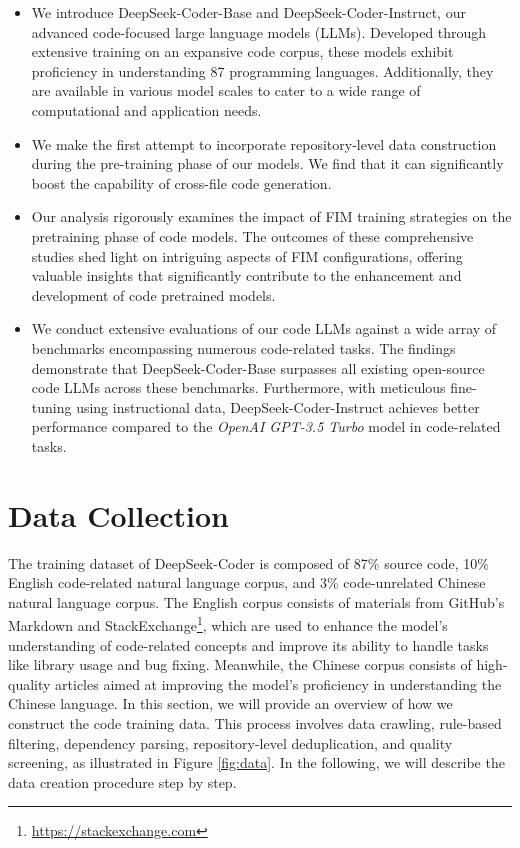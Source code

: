 \begin{itemize}[leftmargin=20pt]
    \item We introduce DeepSeek-Coder-Base and DeepSeek-Coder-Instruct, our advanced code-focused large language models (LLMs). Developed through extensive training on an expansive code corpus, these models exhibit proficiency in understanding 87 programming languages. Additionally, they are available in various model scales to cater to a wide range of computational and application needs.
    \item  We make the first attempt to incorporate repository-level data construction during the pre-training phase of our models. We find that it can significantly boost the capability of cross-file code generation.  
    \item Our analysis rigorously examines the impact of FIM training strategies on the pretraining phase of code models. The outcomes of these comprehensive studies shed light on intriguing aspects of FIM configurations, offering valuable insights that significantly contribute to the enhancement and development of code pretrained models.
    \item We conduct extensive evaluations of our code LLMs against a wide array of benchmarks encompassing numerous code-related tasks. The findings demonstrate that DeepSeek-Coder-Base surpasses all existing open-source code LLMs across these benchmarks. Furthermore, with meticulous fine-tuning using instructional data, DeepSeek-Coder-Instruct achieves better performance compared to the \textit{OpenAI GPT-3.5 Turbo} model in code-related tasks.
\end{itemize}

\section{Data Collection} The training dataset of DeepSeek-Coder is composed of 87\% source code, 10\% English code-related natural language corpus, and 3\% code-unrelated Chinese natural language corpus. The English corpus consists of materials from GitHub's Markdown and StackExchange\footnote{\url{https://stackexchange.com}}, which are used to enhance the model's understanding of code-related concepts and improve its ability to handle tasks like library usage and bug fixing. Meanwhile, the Chinese corpus consists of high-quality articles aimed at improving the model's proficiency in understanding the Chinese language. In this section, we will provide an overview of how we construct the code training data. This process involves data crawling, rule-based filtering, dependency parsing, repository-level deduplication, and quality screening, as illustrated in Figure \ref{fig:data}. In the following, we will describe the data creation procedure step by step.

